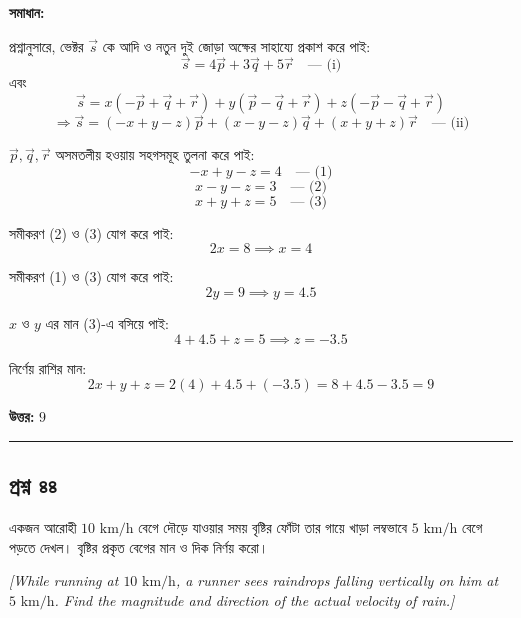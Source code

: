 \documentclass[11pt,a4paper]{article}
\begin{document}
\vspace{0.3cm}
\begin{center}
\end{center}

\textbf{সমাধান:}

প্রশ্নানুসারে, ভেক্টর $\vec{s}$ কে আদি ও নতুন দুই জোড়া অক্ষের সাহায্যে প্রকাশ করে পাই:
$$\vec{s} = 4\vec{p} + 3\vec{q} + 5\vec{r} \quad \text{--- (i)}$$
এবং
$$\vec{s} = x(-\vec{p} + \vec{q} + \vec{r}) + y(\vec{p} - \vec{q} + \vec{r}) + z(-\vec{p} - \vec{q} + \vec{r})$$
$$\Rightarrow \vec{s} = (-x + y - z)\vec{p} + (x - y - z)\vec{q} + (x + y + z)\vec{r} \quad \text{--- (ii)}$$

$\vec{p}, \vec{q}, \vec{r}$ অসমতলীয় হওয়ায় সহগসমূহ তুলনা করে পাই:
$$-x + y - z = 4 \quad \text{--- (1)}$$
$$x - y - z = 3 \quad \text{--- (2)}$$
$$x + y + z = 5 \quad \text{--- (3)}$$

সমীকরণ (2) ও (3) যোগ করে পাই:
$$2x = 8 \implies x = 4$$

সমীকরণ (1) ও (3) যোগ করে পাই:
$$2y = 9 \implies y = 4.5$$

$x$ ও $y$ এর মান (3)-এ বসিয়ে পাই:
$$4 + 4.5 + z = 5 \implies z = -3.5$$

নির্ণেয় রাশির মান:
$$2x + y + z = 2(4) + 4.5 + (-3.5) = 8 + 4.5 - 3.5 = 9$$

\textbf{উত্তর:} $9$

\vspace{0.5cm}
\hrule
\vspace{0.5cm}

\subsection*{প্রশ্ন ৪৪}

একজন আরোহী $10\text{ km/h}$ বেগে দৌড়ে যাওয়ার সময় বৃষ্টির ফোঁটা তার গায়ে খাড়া লম্বভাবে $5\text{ km/h}$ বেগে পড়তে দেখল। বৃষ্টির প্রকৃত বেগের মান ও দিক নির্ণয় করো।

\smallskip
\textit{[While running at $10\text{ km/h}$, a runner sees raindrops falling vertically on him at $5\text{ km/h}$. Find the magnitude and direction of the actual velocity of rain.]}
\end{document}
